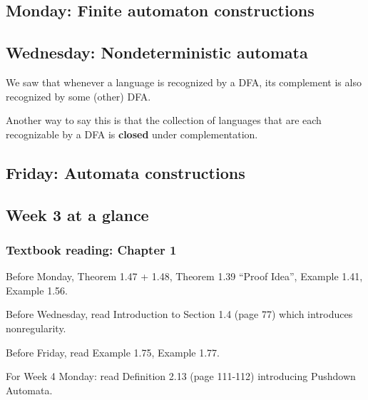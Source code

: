 \newpage
\subsection*{Monday: Finite automaton constructions}



\newpage
\subsection*{Wednesday: Nondeterministic automata}

We saw that whenever a language is recognized by a DFA, its
complement is also recognized by some (other) DFA. 

Another way to say this is that the collection of languages
that are each recognizable by a DFA is {\bf closed} under complementation.




\newpage
\subsection*{Friday: Automata constructions}




\newpage

\subsection*{Week 3 at a glance}

\vspace{-15pt}

\subsubsection*{Textbook reading: Chapter 1}

\vspace{-15pt}

Before Monday, Theorem 1.47 + 1.48, Theorem 1.39 ``Proof Idea'', Example 1.41, Example 1.56.

Before Wednesday, read Introduction to Section 1.4 (page 77) which introduces nonregularity.

Before Friday, read Example 1.75, Example 1.77.

For Week 4 Monday: read Definition 2.13 (page 111-112) introducing Pushdown Automata.

\vspace{-20pt}

